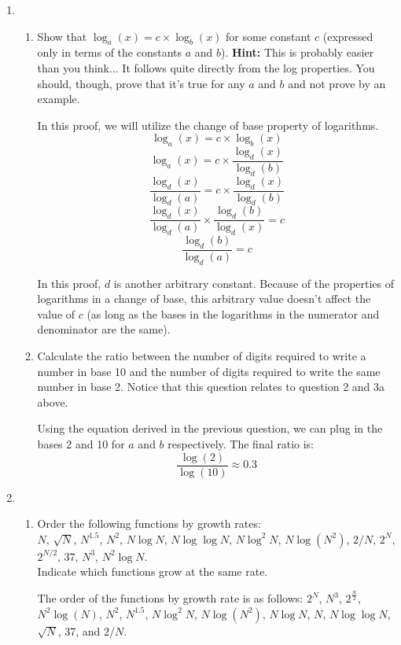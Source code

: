 \documentclass[letterpaper, 11pt]{article}
\begin{document}
\begin{enumerate}[leftmargin=*]
    \item \begin{enumerate}
        \item Show that $\log_a(x) = c \times \log_b(x)$ for some constant $c$ (expressed only in terms of the constants $a$ and $b$). \textbf{Hint:}  This is probably easier than you think... It follows quite directly from the log properties. You should, though, prove that it's true for any $a$ and $b$ and not prove by an example.

        In this proof, we will utilize the change of base property of logarithms.
        \[\log_a(x) = c \times \log_b(x)\]
        \[\log_a(x) = c \times \frac{\log_d({x})}{\log_d({b})}\]
        \[\frac{\log_d(x)}{\log_d(a)} = c \times \frac{\log_d({x})}{\log_d({b})}\]
        \[\frac{\log_d(x)}{\log_d(a)} \times \frac{\log_d({b})}{\log_d({x})} = c\]
        \[\frac{\log_d({b})}{\log_d({a})} = c\]
        
        In this proof, $d$ is another arbitrary constant. Because of the properties of logarithms in a change of base, this arbitrary value doesn't affect the value of $c$ (as long as the bases in the logarithms in the numerator and denominator are the same).
        
        \item Calculate the ratio between the number of digits required to write a number in base 10 and the number of digits required to write the same number in base 2. Notice that this question relates to question 2 and 3a above.

        Using the equation derived in the previous question, we can plug in the bases 2 and 10 for $a$ and $b$ respectively. The final ratio is:
        \[\frac{\log({2})}{\log({10})} \approx 0.3\]
    \end{enumerate}

    \item \begin{enumerate}
        \item Order the following functions by growth rates:\\
        $N$, $\sqrt{N}$, $N^{1.5}$, $N^2$, $N \log{N}$, $N \log \log{N}$, $N \log^2{N}$, $N \log({N^2})$, $2/N$, $2^N$, $2^{N/2}$, 37, $N^3$, $N^2 \log{N}$.\\
        Indicate which functions grow at the same rate.

        The order of the functions by growth rate is as follows: $2^N$, $N^3$, $2^{\frac{N}{2}}$, $N^2 \log({N})$, $N^2$, $N^{1.5}$, $N \log^2{N}$, $N \log({N^2})$, $N \log{N}$, $N$, $N \log \log{N}$, $\sqrt{N}$, 37, and $2/N$.
        

\end{enumerate}
\end{enumerate}
\end{document}
